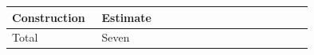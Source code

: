 \begin{tabular}{@{}p{0.28\linewidth}p{0.66\linewidth}@{}}\hline Construction & Estimate \\ \hline Total & Seven \\ \end{tabular}
